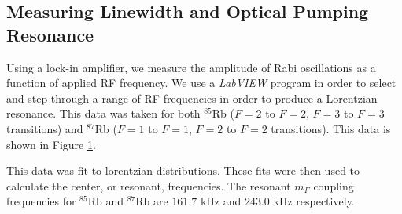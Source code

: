 \subsection{Measuring Linewidth and Optical Pumping Resonance}

Using a lock-in amplifier, we measure the amplitude of Rabi oscillations as a function of applied RF frequency.  We use a \emph{LabVIEW} program in order to select and step through a range of RF frequencies in order to produce a Lorentzian resonance.  This data was taken for both $^{85}$Rb ($F=2$ to $F=2$, $F=3$ to $F=3$ transitions) and $^{87}$Rb ($F=1$ to $F=1$, $F=2$ to $F=2$ transitions).   This data is shown in Figure \ref{fig:rawcurve}.    
\begin{figure}[h!]
\begin{center}
\hspace{-1mm}
\vspace{-2mm}
\vspace{-2mm}
\caption{\small{}}
\label{fig:rawcurve}
\end{center}
\end{figure}
This data was fit to lorentzian distributions.  These fits were then used to calculate the center, or resonant,  frequencies.  The resonant $m_F$ coupling frequencies for $^{85}$Rb and $^{87}$Rb are $161.7$ kHz and $243.0$ kHz respectively.  

